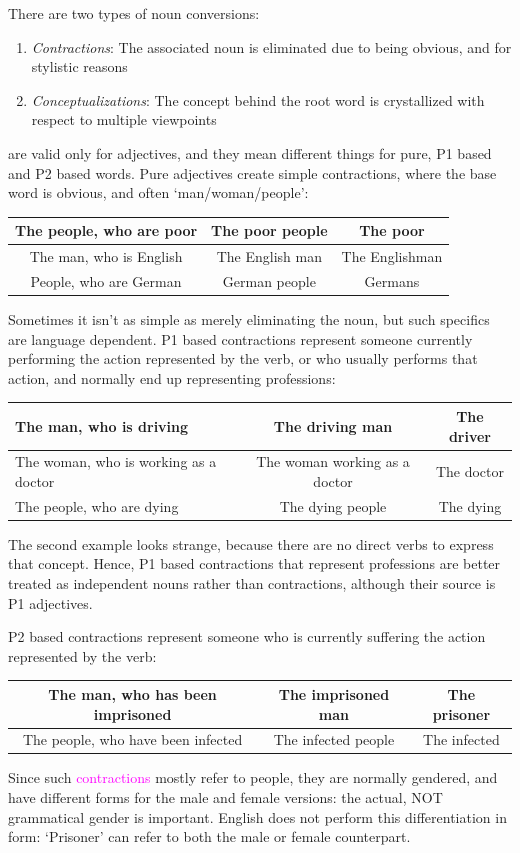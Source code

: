 There are two  types of noun conversions:
\begin{enumerate}
    \item \textit{Contractions}: The associated noun is eliminated due to being obvious, and for stylistic reasons
    \item \textit{Conceptualizations}: The concept behind the root word is crystallized with respect to multiple viewpoints
\end{enumerate}
\textcolor{magenta}{} are valid only for adjectives, and they mean different things for pure, P1 based and P2 based words. Pure adjectives create simple contractions, where the base word is obvious, and often `man/woman/people':
\begin{example}
    \begin{tabular}{c|c|c}
        The people, who are poor & The poor people & The poor\\\hline
        The man, who is English & The English man & The Englishman\\\hline
        People, who are German & German people & Germans
    \end{tabular}
\end{example}
Sometimes it isn't as simple as merely eliminating the noun, but such specifics are language dependent. P1 based contractions represent someone currently performing the action represented by the verb, or who usually performs that action, and normally end up representing professions:
\begin{example}
    \begin{tabular}{m{5cm}|c|c}
        The man, who is driving & The driving man & The driver\\\hline
        The woman, who is working as a doctor & The  woman working as a doctor & The doctor\\\hline
        The people, who are dying & The dying people & The dying
    \end{tabular}
\end{example}
The second example looks strange, because there are no direct verbs to express that concept.  Hence, P1 based contractions that represent professions are better treated as independent nouns rather than contractions, although their source is P1 adjectives.

P2 based contractions represent someone who is currently suffering the action represented by the verb:
\begin{example}
    \begin{tabular}{c|c|c}
        The man, who has been imprisoned & The imprisoned man & The prisoner\\\hline
        The people, who have been infected & The infected people & The infected
    \end{tabular}
\end{example}
Since such \textcolor{magenta}{contractions} mostly refer to people, they are normally gendered, and have different forms for the male and female versions: the actual, NOT grammatical gender is important. English does not perform this differentiation in form: `Prisoner' can refer to both the male or female counterpart. 

